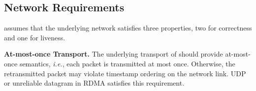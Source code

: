 




\iffalse
\subsection{Network Requirements}
\label{sec:assumptions}

\sys assumes that the underlying network satisfies three properties, two for correctness and one for liveness.

\textbf{At-most-once Transport.}
The underlying transport of \sys should provide at-most-once semantics, \textit{i.e.}, each packet is transmitted at most once.
Otherwise, the retransmitted packet may violate timestamp ordering on the network link.
UDP or unreliable datagram in RDMA satisfies this requirement.

